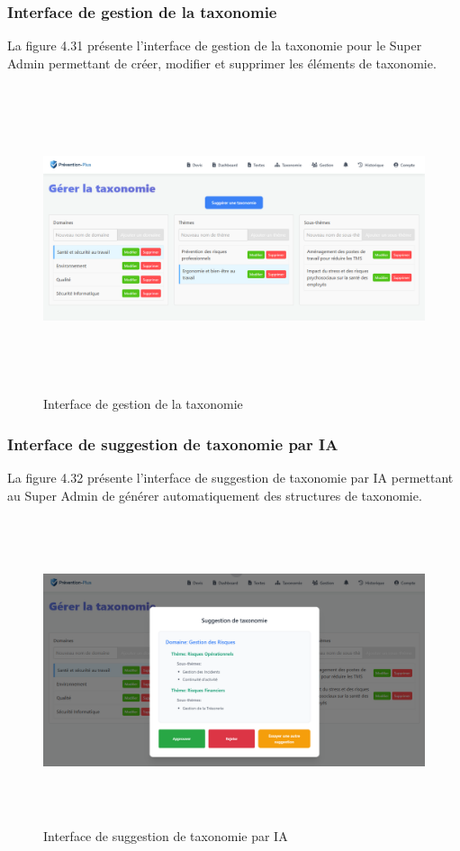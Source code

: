 \subsubsection{Interface de gestion de la taxonomie}
\noindent La figure 4.31 présente l'interface de gestion de la taxonomie pour le Super Admin permettant de créer, modifier et supprimer les éléments de taxonomie.

\begin{figure}[H]
    \centering
    \includegraphics[width=14cm,height=9cm]{images/gestiontaxonomy.PNG}
    \caption{Interface de gestion de la taxonomie}
\end{figure}

\subsubsection{Interface de suggestion de taxonomie par IA}
\noindent La figure 4.32 présente l'interface de suggestion de taxonomie par IA permettant au Super Admin de générer automatiquement des structures de taxonomie.

\begin{figure}[H]
    \centering
    \includegraphics[width=14cm,height=9cm]{images/suggestiontaxonomy.PNG}
    \caption{Interface de suggestion de taxonomie par IA}
\end{figure}

